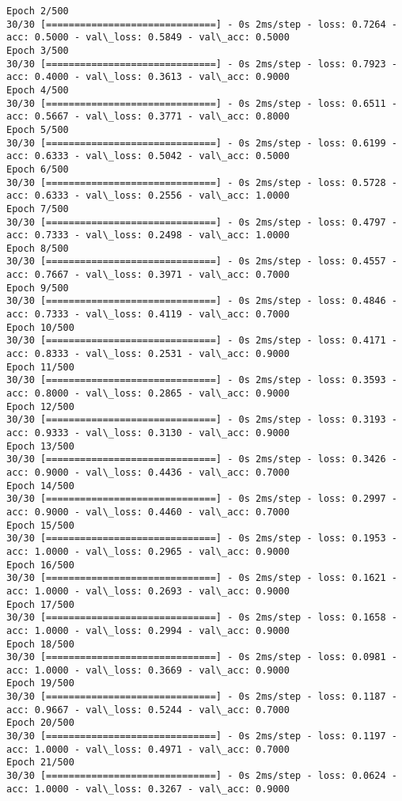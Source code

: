 \documentclass[11pt]{article}
\begin{document}
\begin{Verbatim}[commandchars=\\\{\}]
Epoch 2/500
30/30 [==============================] - 0s 2ms/step - loss: 0.7264 - acc: 0.5000 - val\_loss: 0.5849 - val\_acc: 0.5000
Epoch 3/500
30/30 [==============================] - 0s 2ms/step - loss: 0.7923 - acc: 0.4000 - val\_loss: 0.3613 - val\_acc: 0.9000
Epoch 4/500
30/30 [==============================] - 0s 2ms/step - loss: 0.6511 - acc: 0.5667 - val\_loss: 0.3771 - val\_acc: 0.8000
Epoch 5/500
30/30 [==============================] - 0s 2ms/step - loss: 0.6199 - acc: 0.6333 - val\_loss: 0.5042 - val\_acc: 0.5000
Epoch 6/500
30/30 [==============================] - 0s 2ms/step - loss: 0.5728 - acc: 0.6333 - val\_loss: 0.2556 - val\_acc: 1.0000
Epoch 7/500
30/30 [==============================] - 0s 2ms/step - loss: 0.4797 - acc: 0.7333 - val\_loss: 0.2498 - val\_acc: 1.0000
Epoch 8/500
30/30 [==============================] - 0s 2ms/step - loss: 0.4557 - acc: 0.7667 - val\_loss: 0.3971 - val\_acc: 0.7000
Epoch 9/500
30/30 [==============================] - 0s 2ms/step - loss: 0.4846 - acc: 0.7333 - val\_loss: 0.4119 - val\_acc: 0.7000
Epoch 10/500
30/30 [==============================] - 0s 2ms/step - loss: 0.4171 - acc: 0.8333 - val\_loss: 0.2531 - val\_acc: 0.9000
Epoch 11/500
30/30 [==============================] - 0s 2ms/step - loss: 0.3593 - acc: 0.8000 - val\_loss: 0.2865 - val\_acc: 0.9000
Epoch 12/500
30/30 [==============================] - 0s 2ms/step - loss: 0.3193 - acc: 0.9333 - val\_loss: 0.3130 - val\_acc: 0.9000
Epoch 13/500
30/30 [==============================] - 0s 2ms/step - loss: 0.3426 - acc: 0.9000 - val\_loss: 0.4436 - val\_acc: 0.7000
Epoch 14/500
30/30 [==============================] - 0s 2ms/step - loss: 0.2997 - acc: 0.9000 - val\_loss: 0.4460 - val\_acc: 0.7000
Epoch 15/500
30/30 [==============================] - 0s 2ms/step - loss: 0.1953 - acc: 1.0000 - val\_loss: 0.2965 - val\_acc: 0.9000
Epoch 16/500
30/30 [==============================] - 0s 2ms/step - loss: 0.1621 - acc: 1.0000 - val\_loss: 0.2693 - val\_acc: 0.9000
Epoch 17/500
30/30 [==============================] - 0s 2ms/step - loss: 0.1658 - acc: 1.0000 - val\_loss: 0.2994 - val\_acc: 0.9000
Epoch 18/500
30/30 [==============================] - 0s 2ms/step - loss: 0.0981 - acc: 1.0000 - val\_loss: 0.3669 - val\_acc: 0.9000
Epoch 19/500
30/30 [==============================] - 0s 2ms/step - loss: 0.1187 - acc: 0.9667 - val\_loss: 0.5244 - val\_acc: 0.7000
Epoch 20/500
30/30 [==============================] - 0s 2ms/step - loss: 0.1197 - acc: 1.0000 - val\_loss: 0.4971 - val\_acc: 0.7000
Epoch 21/500
30/30 [==============================] - 0s 2ms/step - loss: 0.0624 - acc: 1.0000 - val\_loss: 0.3267 - val\_acc: 0.9000

\end{Verbatim}
\end{document}
